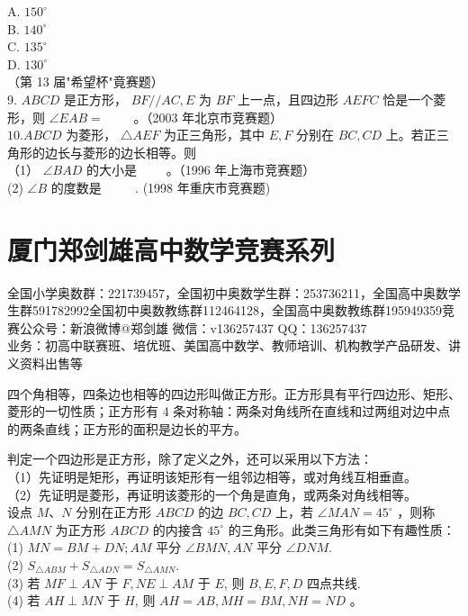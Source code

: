 \documentclass[10pt]{article}
\begin{document}
A. $150^{\circ}$\\
B. $140^{\circ}$\\
C. $135^{\circ}$\\
D. $130^{\circ}$\\
（第 13 届"希望杯"竟赛题）\\
9. $A B C D$ 是正方形， $B F / / A C, E$ 为 $B F$ 上一点，且四边形 $A E F C$ 恰是一个菱形，则 $\angle E A B=$ $\qquad$。（2003 年北京市竞赛题）\\
$10 . A B C D$ 为菱形， $\triangle A E F$ 为正三角形，其中 $E, F$ 分别在 $B C, C D$ 上。若正三角形的边长与菱形的边长相等。则\\
（1） $\angle B A D$ 的大小是 $\qquad$。（1996 年上海市竞赛题）\\
(2) $\angle B$ 的度数是 $\qquad$ . (1998 年重庆市竞赛题)

\section*{厦门郑剑雄高中数学竞赛系列}
全国小学奥数群：221739457，全国初中奥数学生群：253736211，全国高中奥数学生群591782992全国初中奥数教练群112464128，全国高中奥数教练群195949359竞赛公众号：新浪微博@郑剑雄 微信：v136257437 QQ：136257437\\
业务：初高中联赛班、培优班、美国高中数学、教师培训、机构教学产品研发、讲义资料出售等

四个角相等，四条边也相等的四边形叫做正方形。正方形具有平行四边形、矩形、菱形的一切性质；正方形有 4 条对称轴：两条对角线所在直线和过两组对边中点的两条直线；正方形的面积是边长的平方。

判定一个四边形是正方形，除了定义之外，还可以采用以下方法：\\
（1）先证明是矩形，再证明该矩形有一组邻边相等，或对角线互相垂直。\\
（2）先证明是菱形，再证明该菱形的一个角是直角，或两条对角线相等。\\
设点 $M 、 N$ 分别在正方形 $A B C D$ 的边 $B C, C D$ 上，若 $\angle M A N=45^{\circ}$ ，则称 $\triangle A M N$ 为正方形 $A B C D$ 的内接含 $45^{\circ}$ 的三角形。此类三角形有如下有趣性质：\\
(1) $M N=B M+D N ; A M$ 平分 $\angle B M N, A N$ 平分 $\angle D N M$.\\
(2) $S_{\triangle A B M}+S_{\triangle A D N}=S_{\triangle A M N}$.\\
(3) 若 $M F \perp A N$ 于 $F, N E \perp A M$ 于 $E$, 则 $B, E, F, D$ 四点共线.\\
(4) 若 $A H \perp M N$ 于 $H$, 则 $A H=A B, M H=B M, N H=N D$ 。
\end{document}
